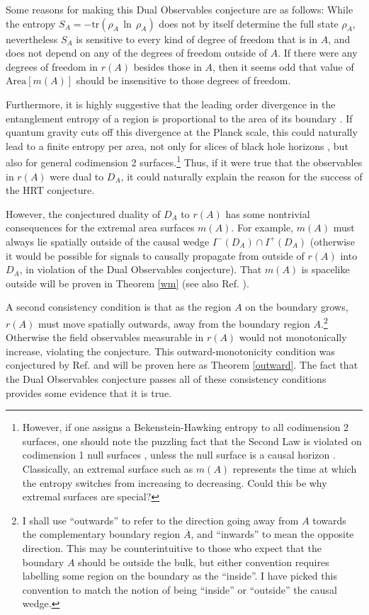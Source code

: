 \documentclass[12pt]{article}
\begin{document}
Some reasons for making this Dual Observables conjecture are as follows:  While the entropy $S_A = -\mathrm{tr}(\rho_A\,\ln\,\rho_A)$ does not by itself determine the full state $\rho_A$, nevertheless $S_A$ is sensitive to every kind of degree of freedom that is in $A$, and does not depend on any of the degrees of freedom outside of $A$.   If there were any degrees of freedom in $r(A)$ besides those in $A$, then it seems odd that value of $\mathrm{Area}[m(A)]$ should be insensitive to those degrees of freedom.  

Furthermore, it is highly suggestive that the leading order divergence in the entanglement entropy of a region is proportional to the area of its boundary \cite{diverge}.  If quantum gravity cuts off this divergence at the Planck scale, this could naturally lead to a finite entropy per area, not only for slices of black hole horizons \cite{area}, but also for general codimension 2 surfaces.\footnote{However, if one assigns a Bekenstein-Hawking entropy to all codimension 2 surfaces, one should note the puzzling fact that the Second Law is violated on codimension 1 null surfaces \cite{10proofs}, unless the null surface is a causal horizon \cite{JP03}.  Classically, an extremal surface such as $m(A)$ represents the time at which the entropy switches from increasing to decreasing.  Could this be why extremal surfaces are special?} Thus, if it were true that the observables in $r(A)$ were dual to $D_A$, it could naturally explain the reason for the success of the HRT conjecture.

However, the conjectured duality of $D_A$ to $r(A)$ has some nontrivial consequences for the extremal area surfaces $m(A)$.  For example, $m(A)$ must always lie spatially outside of the causal wedge $I^-(D_A) \cap I^+(D_A)$ (otherwise it would be possible for signals to causally propagate from outside of $r(A)$ into $D_A$, in violation of the Dual Observables conjecture).  That $m(A)$ is spacelike outside will be proven in Theorem \ref{wm} (see also Ref. \cite{HR12}).

A second consistency condition is that as the region $A$ on the boundary grows, $r(A)$ must move spatially outwards, away from the boundary region $A$.\footnote{I shall use ``outwards'' to refer to the direction going away from $A$ towards the complementary boundary region $\overline{A}$, and ``inwards'' to mean the opposite direction.  This may be counterintuitive to those who expect that the boundary $A$ should be outside the bulk, but either convention requires labelling some region on the boundary as the ``inside''.  I have picked this convention to match the notion of being ``inside'' or ``outside'' the causal wedge.}  Otherwise the field observables measurable in $r(A)$ would not monotonically increase, violating the conjecture.  This outward-monotonicity condition was conjectured by Ref. \cite{CKNR12} and will be proven here as Theorem \ref{outward}.  The fact that the Dual Observables conjecture passes all of these consistency conditions provides some evidence that it is true.
\end{document}
